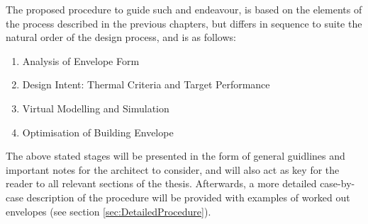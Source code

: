 The proposed procedure to guide such and endeavour, is based on the elements of the process described in the previous chapters, but differs in sequence to suite the natural order of the design process, and is as follows:

\begin{enumerate}
	\item Analysis of Envelope Form
	\item Design Intent: Thermal Criteria and Target Performance
	\item Virtual Modelling and Simulation
	\item Optimisation of Building Envelope
\end{enumerate}

The above stated stages will be presented in the form of general guidlines and important notes for the architect to consider, and will also act as key for the reader to all relevant sections of the thesis. Afterwards, a more detailed case-by-case description of the procedure will be provided with examples of worked out envelopes (see section \ref{sec:DetailedProcedure}).

